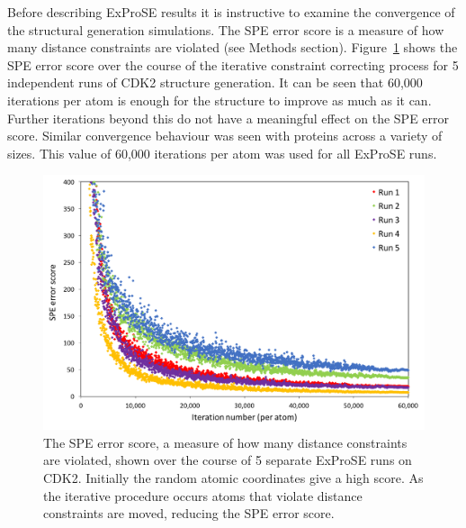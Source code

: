 
Before describing ExProSE results it is instructive to examine the convergence of the structural generation simulations.
The SPE error score is a measure of how many distance constraints are violated (see Methods section).
Figure~\ref{fig:spe_convergence} shows the SPE error score over the course of the iterative constraint correcting process for 5 independent runs of CDK2 structure generation.
It can be seen that 60,000 iterations per atom is enough for the structure to improve as much as it can.
Further iterations beyond this do not have a meaningful effect on the SPE error score.
Similar convergence behaviour was seen with proteins across a variety of sizes.
This value of 60,000 iterations per atom was used for all ExProSE runs.


\begin{figure}
\centering

\includegraphics[width=\textwidth]{figures/spe_convergence/spe_convergence}

\caption[Convergence of the ExProSE SPE error score for 5 separate runs on CDK2]
{The SPE error score, a measure of how many distance constraints are violated, shown over the course of 5 separate ExProSE runs on CDK2.
Initially the random atomic coordinates give a high score.
As the iterative procedure occurs atoms that violate distance constraints are moved, reducing the SPE error score.}

\label{fig:spe_convergence}
\end{figure}


